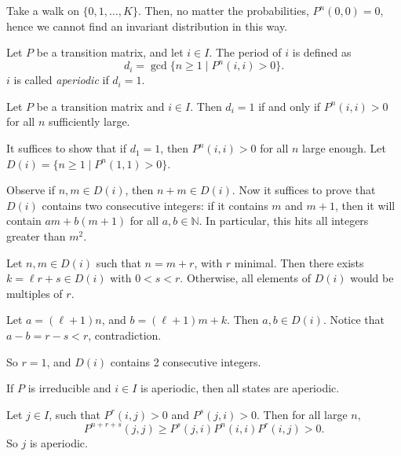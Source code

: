 \documentclass[12pt]{article}
\begin{document}
\begin{exbox}
	Take a walk on $\{0, 1, \ldots, K\}$. Then, no matter the probabilities, $P^{n}(0, 0) = 0$, hence we cannot find an invariant distribution in this way.
\end{exbox}

\begin{definition}
	Let $P$ be a transition matrix, and let $i \in I$. The period of $i$ is defined as
	\[
		d_i = \gcd \{n \geq 1 \mid P^{n}(i, i) > 0\}
	.\]
	$i$ is called \textit{aperiodic} if $d_i = 1$.
\end{definition}

\begin{lemma}
	Let $P$ be a transition matrix and $i \in I$. Then $d_i = 1$ if and only if $P^{n}(i, i) > 0$ for all $n$ sufficiently large.
\end{lemma}

\begin{proofbox}
	It suffices to show that if $d_1 = 1$, then $P^{n}(i, i) > 0$ for all $n$ large enough. Let $D(i) = \{n \geq 1 \mid P^{n}(1, 1) > 0\}$.

	Observe if $n, m \in D(i)$, then $n + m \in D(i)$. Now it suffices to prove that $D(i)$ contains two consecutive integers: if it contains $m$ and $m+1$, then it will contain $am + b(m+1)$ for all $a, b \in \mathbb{N}$. In particular, this hits all integers greater than $m^2$.

	Let $n, m \in D(i)$ such that $n = m + r$, with $r$ minimal. Then there exists $k = \ell r + s \in D(i)$ with $0 < s < r$. Otherwise, all elements of $D(i)$ would be multiples of $r$.

	Let $a = (\ell + 1)n$, and $b = (\ell + 1)m + k$. Then $a, b \in D(i)$. Notice that $a - b = r - s < r$, contradiction.

	So $r = 1$, and $D(i)$ contains 2 consecutive integers.
\end{proofbox}

\begin{lemma}
	If $P$ is irreducible and $i \in I$ is aperiodic, then all states are aperiodic.
\end{lemma}

\begin{proofbox}
	Let $j \in I$, such that $P^{r}(i, j) > 0$ and $P^{s}(j, i) > 0$. Then for all large $n$,
	\[
		P^{n+r+s}(j,j) \geq P^{s}(j, i) P^{n}(i,i) P^{r}(i,j) > 0
	.\]
	So $j$ is aperiodic.
\end{proofbox}



\newpage

\printindex
\end{document}
